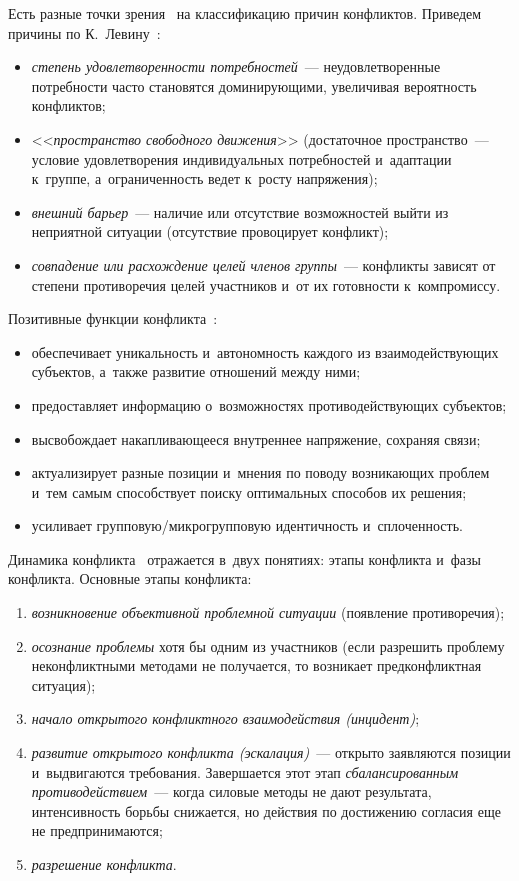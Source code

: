 \begin{multicols}{2}
  Есть разные точки зрения~\cite{9-r, 12-r} на классификацию причин 
конфликтов. Приведем причины по К.~Левину~\cite{9-r}: 
\begin{itemize}
\item \textit{степень 
удовлетворенности потребностей}~--- неудовлетворенные по\-треб\-но\-сти час\-то 
становятся до\-ми\-ни\-ру\-ющи\-ми, увеличивая ве\-ро\-ят\-ность конфликтов; 
\item <<\textit{пространство свободного движения}>> (достаточное  
пространство~--- условие удовлетворения индивидуальных по\-треб\-но\-стей 
и~адаптации к~группе, а~огра\-ни\-чен\-ность ведет к~рос\-ту на\-пря\-же\-ния); 
\item \textit{внешний барьер}~--- наличие или отсутствие возможностей выйти из 
неприятной ситуации (отсутствие провоцирует конфликт); 
\item \textit{совпадение 
или расхождение целей членов группы}~--- конфликты зависят от степени 
противоречия целей участников и~от их го\-тов\-ности к~компромиссу.
\end{itemize}
  
  Позитивные функции конфликта~\cite{8-r}: 
  \begin{itemize}
  \item обеспечивает уникальность 
и~автономность каждого из взаимодействующих субъектов, а~также развитие 
отношений между ними; 
\item предоставляет информацию о~воз\-мож\-но\-стях 
противодействующих субъектов; 
\item высвобождает накапливающееся внутреннее 
на\-пря\-же\-ние, сохраняя связи; 
\item актуализирует разные позиции и~мнения по 
поводу возникающих проб\-лем и~тем самым способствует поиску оптимальных 
способов их решения; 
\item усиливает груп\-по\-вую/мик\-ро\-груп\-по\-вую 
идентичность и~сплоченность.
\end{itemize}
  
  Динамика конфликта~\cite{10-r, 11-r} отражается в~двух понятиях: этапы 
конфликта и~фазы конфликта. Основные этапы конфликта: 
\begin{enumerate}[(1)]
\item \textit{возникновение объективной проблемной ситуации} (появление 
противоречия); 
\item \textit{осознание проблемы} хотя бы одним из участников 
(если разрешить проблему неконфликтными методами не получается, то 
возникает предконфликтная ситуация); 
\item \textit{начало открытого 
конфликтного взаимодействия (инцидент)}; 
\item \textit{развитие открытого 
конфликта (эскалация)}~--- открыто заявляются позиции и~выдвигаются 
требования. Завершается этот этап \textit{сбалансированным 
противодействием}~--- когда силовые методы не дают результата, 
интенсивность борьбы снижается, но действия по достижению согласия еще не 
предпринимаются; 
\item \textit{разрешение конфликта}. 
\end{enumerate}
  

\end{multicols}
